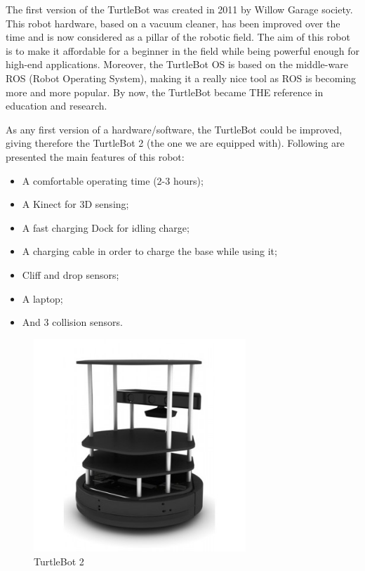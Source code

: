 \documentclass[aps,letterpaper,11pt]{revtex4}
\begin{document}
The first version of the TurtleBot was created in 2011 by Willow Garage society. This robot hardware, based on a vacuum cleaner, has been improved over the time and is now considered as a pillar of the robotic field. The aim of this robot is to make it affordable for a beginner in the field while being powerful enough for high-end applications. Moreover, the TurtleBot OS is based on the middle-ware ROS (Robot Operating System), making it a really nice tool as ROS is becoming more and more popular. By now, the TurtleBot became THE reference in education and research.

As any first version of a hardware/software, the TurtleBot could be improved, giving therefore the TurtleBot 2 (the one we are equipped with). Following are presented the main features of this robot:

\begin{itemize}
\item {A comfortable operating time (2-3 hours);}
\item {A Kinect for 3D sensing;}
\item {A fast charging Dock for idling charge;}
\item {A charging cable in order to charge the base while using it;}
\item {Cliff and drop sensors;}
\item {A laptop;}
\item {And 3 collision sensors.}
\end{itemize}

\begin{figure}[H]
	\centering
	\includegraphics[height=8cm]{turtlebot-2-robot-mobile-ros.jpg}
	\caption{TurtleBot 2}
	\label{fig:Robot Components}    
\end{figure}
\end{document}
